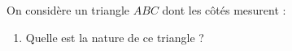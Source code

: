 \begin{exo}{}
	On considère un triangle $ABC$ dont les côtés mesurent :


	\begin{enumerate}
		\item Quelle est la nature de ce triangle ?
	\end{enumerate}
\end{exo}
